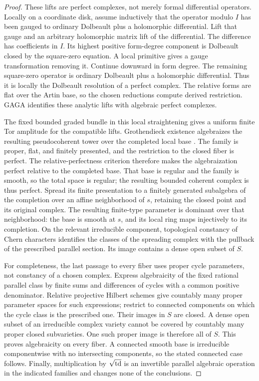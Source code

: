\begin{proof}
These lifts are perfect complexes, not merely formal differential
operators.  Locally on a coordinate disk, assume inductively that the
operator modulo \(I\) has been gauged to ordinary Dolbeault plus a
holomorphic differential.  Lift that gauge and an arbitrary
holomorphic matrix lift of the differential.  The difference has
coefficients in \(I\).  Its highest positive form-degree component is
Dolbeault closed by the square-zero equation.  A local primitive gives
a gauge transformation removing it.  Continue downward in form
degree.  The remaining square-zero operator is ordinary Dolbeault
plus a holomorphic differential.  Thus it is locally the Dolbeault
resolution of a perfect complex.  The relative forms are flat over
the Artin base, so the chosen reductions compute derived restriction.
GAGA identifies these analytic lifts with algebraic perfect complexes.

The fixed bounded graded bundle in this local straightening gives
a uniform finite Tor amplitude for the compatible lifts.
Grothendieck existence algebraizes the resulting pseudocoherent tower
over the completed local base
\cite[Theorem~38.29.6, Tag~0DIG]{PerfectGrothendieckExistence}.
The family is proper, flat, and finitely presented, and the restriction
to the closed fiber is perfect.  The relative-perfectness criterion
\cite[Lemma~37.71.3, Tag~0DJZ]{PerfectGrothendieckExistence} therefore
makes the algebraization perfect relative to the completed base.
That base is regular and the family is smooth, so the total space is
regular; the resulting bounded coherent complex is thus perfect.
Spread its finite presentation to a finitely generated subalgebra of
the completion over an affine neighborhood of \(s\), retaining the
closed point and its original complex.  The resulting finite-type
parameter is dominant over that neighborhood: the base is smooth at
\(s\), and its local ring maps injectively to its completion.
On the relevant irreducible component, topological constancy of Chern
characters identifies the classes of the spreading complex with the
pullback of the prescribed parallel section.  Its image contains a
dense open subset of \(S\).

For completeness, the last passage to every fiber uses proper cycle
parameters, not constancy of a chosen complex.  Express algebraicity
of the fixed rational parallel class by finite sums and differences
of cycles with a common positive denominator.  Relative projective
Hilbert schemes give countably many proper parameter spaces for such
expressions; restrict to connected components on which the cycle
class is the prescribed one.  Their images in \(S\) are closed.
A dense open subset of an irreducible complex variety cannot be
covered by countably many proper closed subvarieties.  One such
proper image is therefore all of \(S\).  This proves algebraicity on
every fiber.  A connected smooth base is irreducible componentwise
with no intersecting components, so the stated connected case follows.
Finally, multiplication by \(\sqrt{\operatorname{td}}\) is an invertible parallel
algebraic operation in the indicated families and changes none of
the conclusions.
\end{proof}

